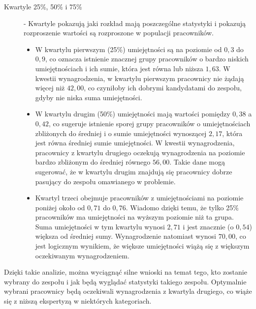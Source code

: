 \begin{description}
        \item[Kwartyle 25\%, 50\% i 75\%\label{itm:kwartyl}] - Kwartyle pokazują jaki rozkład mają poszczególne statystyki i pokazują rozproszenie wartości są rozproszone w populacji pracowników. 
            \begin{itemize}
                \item W kwartylu pierwszym (25\%) umiejętności są na poziomie od $0,3$ do $0,9$, co oznacza istnienie znacznej grupy pracowników o bardzo niskich umiejętnościach i ich sumie, która jest równa lub niższa $1,63$. W kwestii wynagrodzenia, w kwartylu pierwszym pracownicy nie żądają więcej niż $42,00$, co czyniłoby ich dobrymi kandydatami do zespołu, gdyby nie niska suma umiejętności.
                \item W kwartylu drugim (50\%) umiejętności mają wartości pomiędzy $0,38$ a $0,42$, co sugeruje istnienie sporej grupy pracowników o umiejętnościach zbliżonych do średniej i o sumie umiejętności wynoszącej $2,17$, która jest równa średniej sumie umiejętności. W kwestii wynagrodzenia, pracownicy z kwartylu drugiego oczekują wynagrodzenia na poziomie bardzo zbliżonym do średniej równego $56,00$. Takie dane mogą sugerować, że w kwartylu drugim znajdują się pracownicy dobrze pasujący do zespołu omawianego w problemie.
                \item Kwartyl trzeci obejmuje pracowników z umiejętnościami na poziomie poniżej około od $0,71$ do $0,76$. Wiadomo dzięki temu, że tylko 25\% pracowników ma umiejętności na wyższym poziomie niż ta grupa. Suma umiejętności w tym kwartylu wynosi $2,71$ i jest znacznie (o $0,54$) większa od średniej sumy. Wynagrodzenie natomiast wynosi $70,00$, co jest logicznym wynikiem, że większe umiejętności wiążą się z większym oczekiwanym wynagrodzeniem.
            \end{itemize}
        
    \end{description}
    \par Dzięki takie analizie, można wyciągnąć silne wnioski na temat tego, kto zostanie wybrany do zespołu i jak będą wyglądać statystyki takiego zespołu. Optymalnie wybrani pracownicy będą oczekiwali wynagrodzenia z kwartyla drugiego, co wiąże się z niższą ekspertyzą w niektórych kategoriach.
    
